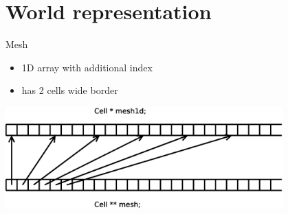 \documentclass{beamer}
\begin{document}
\section{World representation}

\begin{frame}{Mesh}
    \begin{itemize}
        \item 1D array with additional index
        \item has 2 cells wide border
    \end{itemize}

    \includegraphics[width=0.8\textwidth]{mesh}
\end{frame}
\end{document}

